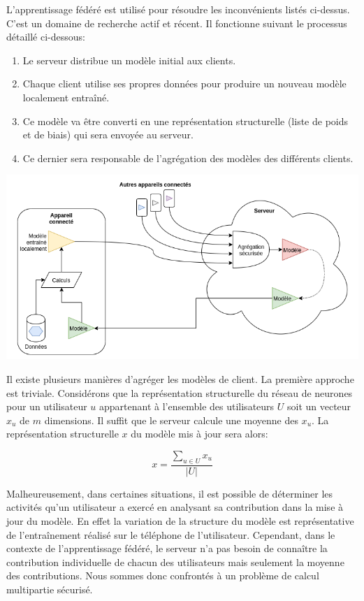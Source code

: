\documentclass{article}
\begin{document}
L'apprentissage fédéré est utilisé pour résoudre les inconvénients listés ci-dessus. C'est un domaine de recherche actif et récent. Il fonctionne suivant le processus détaillé ci-dessous:

\begin{enumerate}
    \item Le serveur distribue un modèle initial aux clients.
    \item Chaque client utilise ses propres données pour produire un nouveau modèle localement entraîné.
    \item Ce modèle va être converti en une représentation structurelle (liste de poids et de biais) qui sera envoyée au serveur.
    \item Ce dernier sera responsable de l'agrégation des modèles des différents clients.
\end{enumerate}

\centerline{\includegraphics[width=14cm]{decentralize.png}}

Il existe plusieurs manières d'agréger les modèles de client. La première approche est triviale. Considérons que la représentation structurelle du réseau de neurones pour un utilisateur $u$ appartenant à l'ensemble des utilisateurs $U$ soit un vecteur $x_{u}$ de $m$ dimensions. Il suffit que le serveur calcule une moyenne des $x_{u}$. La représentation structurelle $x$ du modèle mis à jour sera alors:

\[
   x = \frac{{}\sum_{u\in U}x_{u}}{|U|}
\]

Malheureusement, dans certaines situations, il est possible de déterminer les activités qu'un utilisateur a exercé en analysant sa contribution dans la mise à jour du modèle. En effet la variation de la structure du modèle est représentative de l'entraînement réalisé sur le téléphone de l'utilisateur. Cependant, dans le contexte de l'apprentissage fédéré, le serveur n'a pas besoin de connaître la contribution individuelle de chacun des utilisateurs mais seulement la moyenne des contributions. Nous sommes donc confrontés à un problème de calcul multipartie sécurisé.
\end{document}
